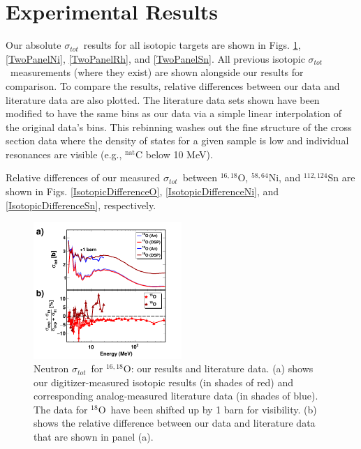 \documentclass[twocolumn,secnumarabic,amssymb, nobibnotes, aps, prl,
superscriptaddress, nobalancelastpage]{revtex4}
\newcommand{\tot}{\ensuremath{\sigma_{tot}}}
\newcommand{\oEight}{\ensuremath{^{18}}O}
\newcommand{\oSixEight}{\ensuremath{^{16,18}}O}
\begin{document}
\section{Experimental Results}

Our absolute \tot\ results for all isotopic targets are shown in Figs.
\ref{TwoPanelO}, \ref{TwoPanelNi}, \ref{TwoPanelRh}, and \ref{TwoPanelSn}.
All previous
isotopic \tot\ measurements
(where they exist) are shown alongside our results for comparison.
To compare the results, relative differences between our data and literature
data are also plotted. The literature
data sets shown have been modified to have the same bins as our data via a simple
linear interpolation of the original data's bins. This rebinning
washes out the fine structure of the cross section data where the density of states
for a given sample is low and individual resonances are visible
(e.g., $^{\text{nat}}$C below 10 MeV).

Relative differences of our measured \tot\ between $^{16,18}$O, $^{58,64}$Ni, and
$^{112,124}$Sn are shown in Figs. \ref{IsotopicDifferenceO},
\ref{IsotopicDifferenceNi}, and 
\ref{IsotopicDifferenceSn}, respectively. 
\begin{figure}[tb]
    \centering
    \includegraphics[width=0.5\textwidth]{figures/TwoPanelO.png}
    \caption[Neutron \tot\ for \oSixEight: our results and literature data]
    {Neutron \tot\ for \oSixEight: our results and literature data.
        (a) shows our digitizer-measured isotopic results (in shades of red) and
        corresponding analog-measured literature data \cite{Finlay1993, Perey1972, Vaughn1965,
        Salisbury1965} (in shades of blue). The data for \oEight\ have been
        shifted up by 1 barn for visibility.
        (b) shows the relative difference between our data
        and literature data that are shown in panel (a).
    }
    \label{TwoPanelO}
\end{figure}
\end{document}
